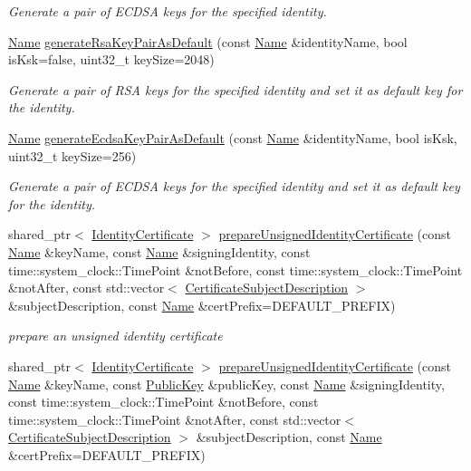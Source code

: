 \begin{DoxyCompactItemize}
\begin{DoxyCompactList}\small\item\em Generate a pair of E\+C\+D\+SA keys for the specified identity. \end{DoxyCompactList}\item 
\hyperlink{classndn_1_1Name}{Name} \hyperlink{classndn_1_1security_1_1KeyChain_af90c9766ac7c6fc2b219ba10355173fc}{generate\+Rsa\+Key\+Pair\+As\+Default} (const \hyperlink{classndn_1_1Name}{Name} \&identity\+Name, bool is\+Ksk=false, uint32\+\_\+t key\+Size=2048)
\begin{DoxyCompactList}\small\item\em Generate a pair of R\+SA keys for the specified identity and set it as default key for the identity. \end{DoxyCompactList}\item 
\hyperlink{classndn_1_1Name}{Name} \hyperlink{classndn_1_1security_1_1KeyChain_ab28660230a99ead349de7c6f06a7c691}{generate\+Ecdsa\+Key\+Pair\+As\+Default} (const \hyperlink{classndn_1_1Name}{Name} \&identity\+Name, bool is\+Ksk, uint32\+\_\+t key\+Size=256)
\begin{DoxyCompactList}\small\item\em Generate a pair of E\+C\+D\+SA keys for the specified identity and set it as default key for the identity. \end{DoxyCompactList}\item 
shared\+\_\+ptr$<$ \hyperlink{classndn_1_1IdentityCertificate}{Identity\+Certificate} $>$ \hyperlink{classndn_1_1security_1_1KeyChain_a536a14c1b3eea7cf72a6e478ad3d28ea}{prepare\+Unsigned\+Identity\+Certificate} (const \hyperlink{classndn_1_1Name}{Name} \&key\+Name, const \hyperlink{classndn_1_1Name}{Name} \&signing\+Identity, const time\+::system\+\_\+clock\+::\+Time\+Point \&not\+Before, const time\+::system\+\_\+clock\+::\+Time\+Point \&not\+After, const std\+::vector$<$ \hyperlink{classndn_1_1CertificateSubjectDescription}{Certificate\+Subject\+Description} $>$ \&subject\+Description, const \hyperlink{classndn_1_1Name}{Name} \&cert\+Prefix=D\+E\+F\+A\+U\+L\+T\+\_\+\+P\+R\+E\+F\+IX)
\begin{DoxyCompactList}\small\item\em prepare an unsigned identity certificate \end{DoxyCompactList}\item 
shared\+\_\+ptr$<$ \hyperlink{classndn_1_1IdentityCertificate}{Identity\+Certificate} $>$ \hyperlink{classndn_1_1security_1_1KeyChain_a06bea75b7883d188257eb1feb056bb3a}{prepare\+Unsigned\+Identity\+Certificate} (const \hyperlink{classndn_1_1Name}{Name} \&key\+Name, const \hyperlink{classndn_1_1PublicKey}{Public\+Key} \&public\+Key, const \hyperlink{classndn_1_1Name}{Name} \&signing\+Identity, const time\+::system\+\_\+clock\+::\+Time\+Point \&not\+Before, const time\+::system\+\_\+clock\+::\+Time\+Point \&not\+After, const std\+::vector$<$ \hyperlink{classndn_1_1CertificateSubjectDescription}{Certificate\+Subject\+Description} $>$ \&subject\+Description, const \hyperlink{classndn_1_1Name}{Name} \&cert\+Prefix=D\+E\+F\+A\+U\+L\+T\+\_\+\+P\+R\+E\+F\+IX)

\end{DoxyCompactItemize}
